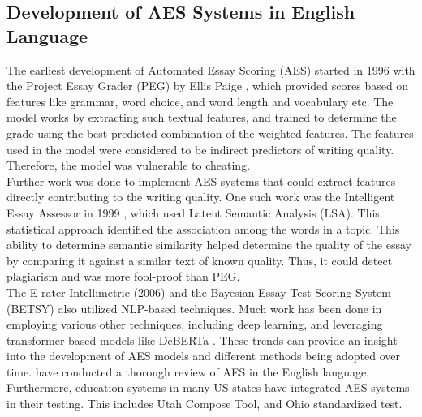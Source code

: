 \documentclass{article}
\begin{document}
	\subsection{Development of AES Systems in English Language}
	The earliest development of Automated Essay Scoring (AES) started in 1996 with the Project Essay Grader (PEG) by Ellis Paige \cite{page2003peg}, which provided scores based on features like grammar, word choice, and word length and vocabulary etc. The model works by extracting such textual features, and trained to determine the grade using the best predicted combination of the weighted features. The features used in the model were considered to be indirect predictors of writing quality. Therefore, the model was vulnerable to cheating. \\ Further work was done to implement AES systems that could extract features directly contributing to the writing quality. One such work was the Intelligent Essay Assessor in 1999 \cite{foltz1999essayassessor}, which used Latent Semantic Analysis (LSA). This statistical approach identified the association among the words in a topic. This ability to determine semantic similarity helped determine the quality of the essay by comparing it against a similar text of known quality. Thus, it could detect plagiarism and was more fool-proof than PEG. \\ The E-rater Intellimetric (2006) \cite{rudner2006intellimetric} and the Bayesian Essay Test Scoring System (BETSY) \cite{rudner2002bayes} also utilized NLP-based techniques. Much work has been done in employing various other techniques, including deep learning, and leveraging transformer-based models like DeBERTa \cite{susanto2023deberta}. These trends can provide an insight into the development of AES models and different methods being adopted over time. \textcite{ramesh2022review} have conducted a thorough review of AES in the English language. \\
	Furthermore, education systems in many US states have integrated AES systems in their testing. This includes Utah Compose Tool, and Ohio standardized test. 
	
	
	
\end{document}
